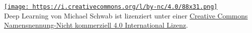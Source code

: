 \href{http://creativecommons.org/licenses/by-nc/4.0/}{\texttt{[image: https://i.creativecommons.org/l/by-nc/4.0/88x31.png]}}\\
{Deep Learning} von {Michael Schwab} ist lizenziert unter einer
\href{http://creativecommons.org/licenses/by-nc/4.0/}{Creative Commons
Namensnennung-Nicht kommerziell 4.0 International Lizenz}.
